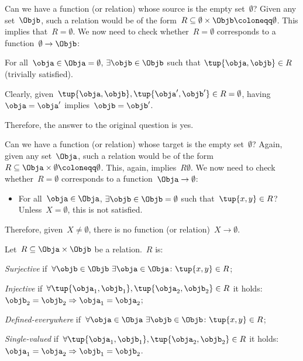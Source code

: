 \begin{example}
    Can we have a function (or relation) whose source is the empty set~$\emptyset$? Given any set~$\Objb$, such a relation would be of the form~$R\subseteq \emptyset \times \Objb \coloneqq \emptyset$. This implies that~$R=\emptyset$. We now need to check whether~$R=\emptyset$ corresponds to a function~$\emptyset\to \Objb$:
    \begin{compactitem}
        \item For all~$\obja\in \Obja=\emptyset$, $\exists \objb \in \Objb$ such that $\tup{\obja,\objb}\in R$ (trivially satisfied).
        \item Clearly, given~$\tup{\obja,\objb}, \tup{\obja',\objb'}\in R=\emptyset$, having~$\obja=\obja'$ implies~$\objb=\objb'$.
    \end{compactitem}
    Therefore, the answer to the original question is yes.
\end{example}

\begin{example}
    Can we have a function (or relation) whose target is the empty set~$\emptyset$? Again, given any set~$\Obja$, such a relation would be of the form~$R\subseteq \Obja\times \emptyset\coloneqq \emptyset$. This, again, implies~$R\emptyset$. We now need to check whether~$R=\emptyset$ corresponds to a function~$\Obja \to \emptyset$:
    \begin{itemize}
        \item For all~$\obja\in \Obja$, $\exists \objb\in \Objb=\emptyset$ such that~$\tup{x,y}\in R$? Unless~$X=\emptyset$, this is not satisfied.
    \end{itemize}
    Therefore, given~$X\neq \emptyset$, there is no function (or relation)~$X\to \emptyset$.
\end{example}

\begin{definition}\label{def:rel_properties}
    Let~$R\subseteq \Obja \times \Objb$ be a relation.~$R$ is:
    \begin{compactenum}
        \item \emph{Surjective} if~$\forall \objb\in \Objb \ \exists \obja\in \Obja\colon \tup{x,y}\in R$;
        \item \emph{Injective} if~$\forall \tup{\obja_1,\objb_1},\tup{\obja_2,\objb_2}\in R$ it holds:~$\objb_2=\objb_2 \Rightarrow \obja_1=\obja_2$;
        \item \emph{Defined-everywhere} if~$\forall \obja\in \Obja \ \exists \objb \in \Objb\colon \tup{x,y}\in R$;
        \item \emph{Single-valued} if~$\forall \tup{\obja_1,\objb_1},\tup{\obja_2,\objb_2}\in R$ it holds:~$\obja_1=\obja_2\Rightarrow \objb_1=\objb_2$.
    \end{compactenum}
\end{definition}

